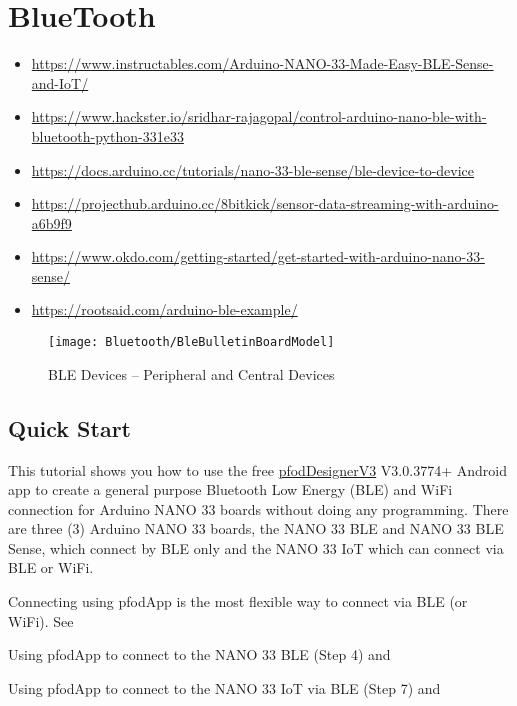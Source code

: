 %
%
%

\chapter{BlueTooth}

\begin{itemize}
  \item \url{https://www.instructables.com/Arduino-NANO-33-Made-Easy-BLE-Sense-and-IoT/}
  \item \url{https://www.hackster.io/sridhar-rajagopal/control-arduino-nano-ble-with-bluetooth-python-331e33}
  \item \url{https://docs.arduino.cc/tutorials/nano-33-ble-sense/ble-device-to-device}
  \item \url{https://projecthub.arduino.cc/8bitkick/sensor-data-streaming-with-arduino-a6b9f9}
  \item \url{https://www.okdo.com/getting-started/get-started-with-arduino-nano-33-sense/}
  \item \url{https://rootsaid.com/arduino-ble-example/}
\end{itemize}


\begin{figure}
    \texttt{[image: Bluetooth/BleBulletinBoardModel]}
    \caption{BLE Devices -- Peripheral and Central Devices}    
\end{figure}


\section{Quick Start}

This tutorial shows you how to use the free \href{https://www.forward.com.au/pfod/pfodDesigner/index.html}{pfodDesignerV3} V3.0.3774+ Android app to create a general purpose Bluetooth Low Energy (BLE) and WiFi connection for Arduino NANO 33 boards without doing any programming. There are three (3) Arduino NANO 33 boards, the NANO 33 BLE and NANO 33 BLE Sense, which connect by BLE only and the NANO 33 IoT which can connect via BLE or WiFi.
    
Connecting using pfodApp is the most flexible way to connect via BLE (or WiFi). See

Using pfodApp to connect to the NANO 33 BLE (Step 4) and

Using pfodApp to connect to the NANO 33 IoT via BLE (Step 7) and

